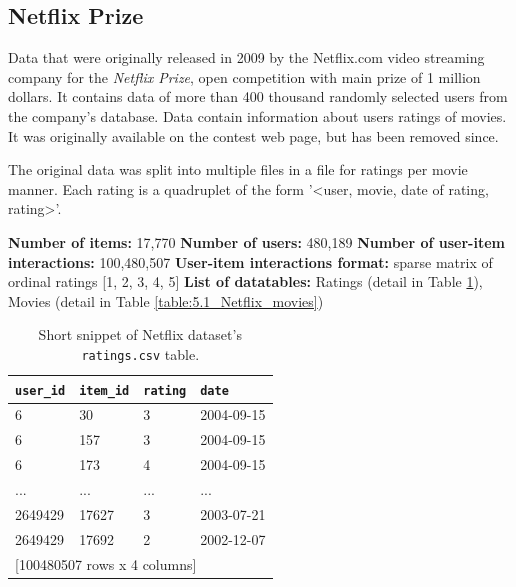 

\subsection{Netflix Prize}

Data that were originally released in 2009 by the Netflix.com video streaming company for the \textit{Netflix Prize}, open competition with main prize of 1 million dollars. It contains data of more than 400 thousand randomly selected users from the company's database. Data contain information about users ratings of movies. It was originally available on the contest web page, but has been removed since.

The original data was split into multiple files in a file for ratings per movie manner. Each rating is a quadruplet of the form '\textless user, movie, date of rating, rating\textgreater'.

\hfill \break
\noindent
\textbf{Number of items:} 17,770 \newline
\textbf{Number of users:} 480,189 \newline
\textbf{Number of user-item interactions:} 100,480,507 \newline
\textbf{User-item interactions format:} sparse matrix of ordinal ratings [1, 2, 3, 4, 5] \newline
\textbf{List of datatables:} Ratings (detail in Table \ref{table:5.1_Netflix_ratings}), Movies (detail in Table \ref{table:5.1_Netflix_movies})

\begin{table}[!ht]
    \centering
    \begin{tabular}{ l l l l }
        \verb|user_id| & \verb|item_id| & \verb|rating| & \verb|date| \\
        \hline
              6 &             30 &             3 &  2004-09-15 \\
              6 &            157 &             3 &  2004-09-15 \\
              6 &            173 &             4 &  2004-09-15 \\
            ... &            ... &           ... &         ... \\
        2649429 &          17627 &             3 &  2003-07-21 \\
        2649429 &          17692 &             2 &  2002-12-07 \\ [1mm]
        \multicolumn{4}{l}{{[100480507 rows x 4 columns]}}
    \end{tabular}
    \caption{Short snippet of Netflix dataset's \texttt{ratings.csv} table.}
    \label{table:5.1_Netflix_ratings}
\end{table}
    
